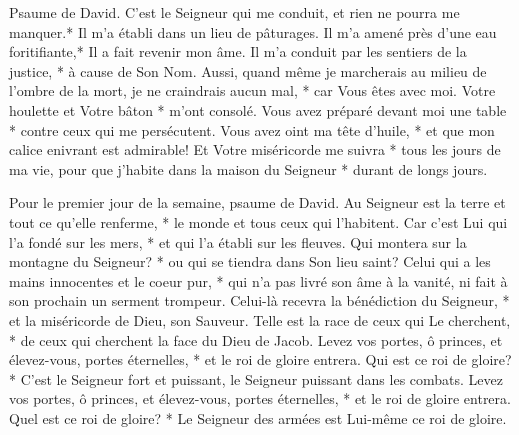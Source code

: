 Psaume de David. C'est le Seigneur qui me conduit, et rien ne pourra me manquer.*
Il m'a établi dans un lieu de pâturages. Il m'a amené près d'une eau foritifiante,*
Il a fait revenir mon âme. Il m'a conduit par les sentiers de la justice, * à cause de Son Nom.
Aussi, quand même je marcherais au milieu de l'ombre de la mort, je ne craindrais aucun mal, * car Vous êtes avec moi. Votre houlette et Votre bâton * m'ont consolé.
Vous avez préparé devant moi une table * contre ceux qui me persécutent. Vous avez oint ma tête d'huile, * et que mon calice enivrant est admirable!
Et Votre miséricorde me suivra * tous les jours de ma vie, pour que j'habite dans la maison du Seigneur * durant de longs jours.

Pour le premier jour de la semaine, psaume de David. Au Seigneur est la terre et tout ce qu'elle renferme, * le monde et tous ceux qui l'habitent.
Car c'est Lui qui l'a fondé sur les mers, * et qui l'a établi sur les fleuves.
Qui montera sur la montagne du Seigneur? * ou qui se tiendra dans Son lieu saint?
Celui qui a les mains innocentes et le coeur pur, * qui n'a pas livré son âme à la vanité, ni fait à son prochain un serment trompeur.
Celui-là recevra la bénédiction du Seigneur, * et la miséricorde de Dieu, son Sauveur.
Telle est la race de ceux qui Le cherchent, * de ceux qui cherchent la face du Dieu de Jacob.
Levez vos portes, ô princes, et élevez-vous, portes éternelles, * et le roi de gloire entrera.
Qui est ce roi de gloire? * C'est le Seigneur fort et puissant, le Seigneur puissant dans les combats.
Levez vos portes, ô princes, et élevez-vous, portes éternelles, * et le roi de gloire entrera.
Quel est ce roi de gloire? * Le Seigneur des armées est Lui-même ce roi de gloire.

